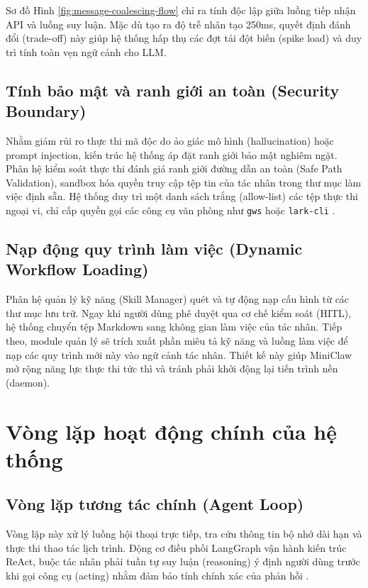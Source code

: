 Sơ đồ Hình \ref{fig:message-coalescing-flow} chỉ ra tính độc lập giữa luồng tiếp nhận API và luồng suy luận. Mặc dù tạo ra độ trễ nhân tạo 250ms, quyết định đánh đổi (trade-off) này giúp hệ thống hấp thụ các đợt tải đột biến (spike load) và duy trì tính toàn vẹn ngữ cảnh cho LLM.

\subsection{Tính bảo mật và ranh giới an toàn (Security Boundary)}
Nhằm giảm rủi ro thực thi mã độc do ảo giác mô hình (hallucination) hoặc prompt injection, kiến trúc hệ thống áp đặt ranh giới bảo mật nghiêm ngặt. Phân hệ kiểm soát thực thi đánh giá ranh giới đường dẫn an toàn (Safe Path Validation), sandbox hóa quyền truy cập tệp tin của tác nhân trong thư mục làm việc định sẵn. Hệ thống duy trì một danh sách trắng (allow-list) các tệp thực thi ngoại vi, chỉ cấp quyền gọi các công cụ văn phòng như \texttt{gws} hoặc \texttt{lark-cli} \cite{googleworkspaceCli,larkCli}.

\subsection{Nạp động quy trình làm việc (Dynamic Workflow Loading)}
Phân hệ quản lý kỹ năng (Skill Manager) quét và tự động nạp cấu hình từ các thư mục lưu trữ. Ngay khi người dùng phê duyệt qua cơ chế kiểm soát (HITL), hệ thống chuyển tệp Markdown sang không gian làm việc của tác nhân. Tiếp theo, module quản lý sẽ trích xuất phần miêu tả kỹ năng và luồng làm việc để nạp các quy trình mới này vào ngữ cảnh tác nhân. Thiết kế này giúp MiniClaw mở rộng năng lực thực thi tức thì và tránh phải khởi động lại tiến trình nền (daemon).

\section{Vòng lặp hoạt động chính của hệ thống}

\subsection{Vòng lặp tương tác chính (Agent Loop)}
Vòng lặp này xử lý luồng hội thoại trực tiếp, tra cứu thông tin bộ nhớ dài hạn và thực thi thao tác lịch trình. Động cơ điều phối LangGraph vận hành kiến trúc ReAct, buộc tác nhân phải tuần tự suy luận (reasoning) ý định người dùng trước khi gọi công cụ (acting) nhằm đảm bảo tính chính xác của phản hồi \cite{langgraphDocs,yao2022react}.

